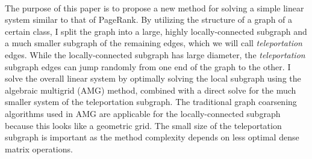 \documentclass{article}
\begin{document}
\\
The purpose of this paper is to propose a new method for solving a simple linear system similar to that of PageRank. By utilizing the structure of a graph of a certain class, I split the graph into a large, highly locally-connected subgraph and a much smaller subgraph of the remaining edges, which we will call \textit{teleportation} edges. While the locally-connected subgraph has large diameter, the \textit{teleportation} subgraph edges can jump randomly from one end of the graph to the other. I solve the overall linear system by optimally solving the local subgraph using the algebraic multigrid (AMG) method, combined with a direct solve for the much smaller system of the teleportation subgraph. The traditional graph coarsening algorithms used in AMG are applicable for the locally-connected subgraph because this looks like a geometric grid. The small size of the teleportation subgraph is important as the method complexity depends on less optimal dense matrix operations.



%
%
\end{document}
